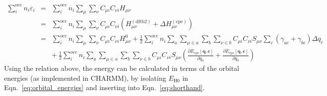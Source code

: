 \documentclass{article}
\numberwithin{equation}{section}
\begin{document}
\begin{eqnarray}
    \sum_i^\mathrm{occ} n_i \varepsilon_i 
    &=& \sum_i^\mathrm{occ} n_i \sum_{\mu} \sum_{\nu}  C_{\mu i} C_{\nu i} H_{\mu\nu}\nonumber\\
    &=& \sum_i^\mathrm{occ} n_i \sum_{\mu} \sum_{\nu}  C_{\mu i} C_{\nu i} \left(H_{\mu\nu}^{\mathrm{(dftb2)}} + \Delta H_{\mu\nu}^{\mathrm{(cpe)}} \right)\nonumber\\
    &=& \sum_i^\mathrm{occ} n_i \sum_{\mu} \sum_{\nu}  C_{\mu i} C_{\nu i} H_{\mu\nu}^0
    + \frac{1}{2} \sum_i^\mathrm{occ} n_i \sum_a \sum_{\mu \in a} \sum_b \sum_{\nu \in b}  C_{\mu i} C_{\nu i} S_{\mu\nu} \sum_c \left( \gamma_{ac} + \gamma_{bc} \right)\Delta q_c \nonumber\\
    && +\ \frac{1}{2} \sum_i^\mathrm{occ} n_i  \sum_a \sum_{\mu \in a} \sum_b \sum_{\nu \in b} C_{\mu i} C_{\nu i} S_{\mu\nu} \left(
    \frac{\partial E_{\mathrm{cpe}}\left[\mathbf{q}, \mathbf{c}\right]}{\partial q_a} +
    \frac{\partial E_{\mathrm{cpe}}\left[\mathbf{q}, \mathbf{c}\right]}{\partial q_b} \right)\label{eq:orbital_energies}
\end{eqnarray}
Using the relation above, the energy can be calculated in terms of the orbital energies (as implemented in CHARMM), by isolating $E_\mathrm{H0}$ in Eqn.~\ref{eq:orbital_energies} and inserting into Eqn.~\ref{eq:shorthand}.
\end{document}
